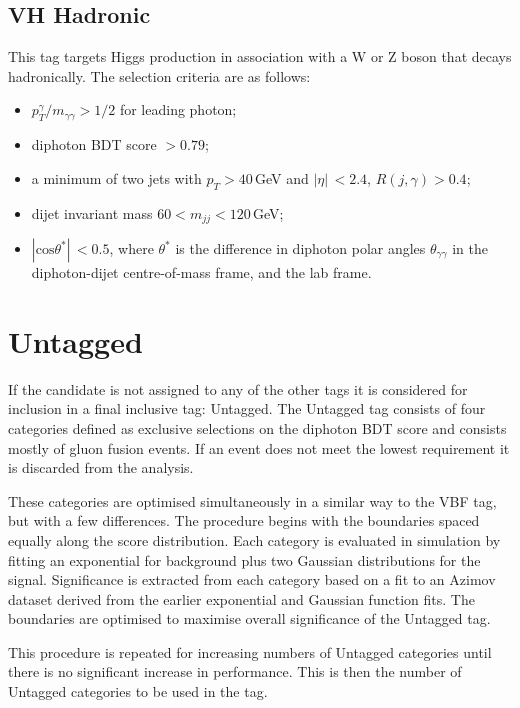 \subsection{VH Hadronic}
This tag targets Higgs production in association with a W or Z boson that decays hadronically. The selection criteria are as follows:
\begin{itemize}[noitemsep]
    \item $p^{\gamma}_{T}/m_{\gamma\gamma} > 1/2$ for leading photon;
    \item diphoton BDT score $> 0.79$;
    \item a minimum of two jets with $p_T > 40$\,GeV and $|\eta|\, < 2.4$, $R(j,\gamma) > 0.4$;
    \item dijet invariant mass $60 < m_{jj} < 120$\,GeV;
    \item $|\mathrm{cos}{\theta^{*}}| \,< 0.5$, where $\theta^{*}$ is the difference in diphoton polar angles $\theta_{\gamma\gamma}$ in the diphoton-dijet centre-of-mass frame, and the lab frame.  
\end{itemize}




\section{Untagged}
If the candidate is not assigned to any of the other tags it is considered for inclusion in a final inclusive tag: Untagged. 
The Untagged tag consists of four categories defined as exclusive selections on the diphoton BDT score and consists mostly of gluon fusion events. 
If an event does not meet the lowest requirement it is discarded from the analysis.

These categories are optimised simultaneously in a similar way to the VBF tag, but with a few differences. 
The procedure begins with the boundaries spaced equally along the score distribution. Each category is evaluated in simulation by fitting an exponential for background plus two Gaussian distributions for the signal. 
Significance is extracted from each category based on a fit to an Azimov dataset \cite{Azimov} derived from the earlier exponential and Gaussian function fits. 
The boundaries are optimised to maximise overall significance of the Untagged tag.

This procedure is repeated for increasing numbers of Untagged categories until there is no significant increase in performance. This is then the number of Untagged categories to be used in the tag.











